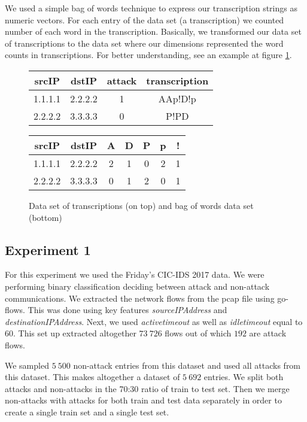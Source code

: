 \documentclass{article}
\begin{document}
We used a simple bag of words technique to express our transcription strings as numeric vectors. For each entry of the data set (a transcription) we counted number of each word in the transcription. Basically, we transformed our data set of transcriptions to the data set where our dimensions represented the word counts in transcriptions. For better understanding, see an example at figure \ref{fig-bag-of-words-example}.

\begin{figure}[h!]
\centering
\begin{tabular}{ |c|c|c|c| }
 \hline
 srcIP & dstIP & attack & transcription \\
 \hline
 1.1.1.1 & 2.2.2.2 & 1 & AAp!D!p \\
 2.2.2.2 & 3.3.3.3 & 0 & P!PD \\
 \hline
\end{tabular}

\vspace{0.3cm}

\begin{tabular}{ |c|c|c|c|c|c|c| }
 \hline
 srcIP & dstIP & A & D & P & p & ! \\
 \hline
 1.1.1.1 & 2.2.2.2 & 2 & 1 & 0 & 2 & 1 \\
 2.2.2.2 & 3.3.3.3 & 0 & 1 & 2 & 0 & 1 \\
 \hline
\end{tabular}
\caption{Data set of transcriptions (on top) and bag of words data set (bottom)}
\label{fig-bag-of-words-example}
\end{figure}


\subsection{Experiment 1}

For this experiment we used the Friday's CIC-IDS 2017 data. We were performing binary classification deciding between attack and non-attack communications. We extracted the network flows from the pcap file using go-flows. This was done using key features \textit{sourceIPAddress} and \textit{destinationIPAddress}. Next, we used \textit{active\textunderscore timeout} as well as \textit{idle\textunderscore timeout} equal to 60. This set up extracted altogether $73\ 726$ flows out of which $192$ are attack flows.

We sampled $5\ 500$ non-attack entries from this dataset and used all attacks from this dataset. This makes altogether a dataset of $5\ 692$ entries. We split both attacks and non-attacks in the 70:30 ratio of train to test set. Then we merge non-attacks with attacks for both train and test data separately in order to create a single train set and a single test set.
\end{document}
